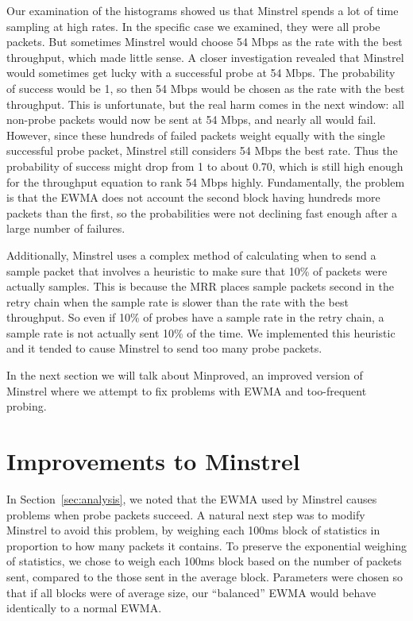 \documentclass[twocolumn,10pt]{article}
\begin{document}
Our examination of the histograms showed us that Minstrel spends a lot
of time sampling at high rates.  In the specific case we examined, they
were all probe packets.  But sometimes Minstrel would choose 54 Mbps as
the rate with the best throughput, which made little sense.  A closer
investigation revealed that Minstrel would sometimes get lucky with a
successful probe at 54 Mbps.  The probability of success would be 1, so
then 54 Mbps would be chosen as the rate with the best throughput.  This
is unfortunate, but the real harm comes in the next window: all non-probe 
packets would now be sent at 54 Mbps, and nearly all would fail.  However,
since these hundreds of failed packets weight equally with the single
successful probe packet, Minstrel still considers 54 Mbps the best
rate.  Thus the probability of success might drop from 1 to about 0.70,
which is still high enough for the throughput equation to rank 54 Mbps
highly.  Fundamentally, the problem is that the EWMA does not account
the second block having hundreds more packets than the first, so the 
probabilities were not declining fast enough after a large number of
   failures.


Additionally, Minstrel uses a complex method of calculating when to send 
a sample packet that involves a heuristic to make sure that 10\% of 
packets were actually samples. This is because the MRR places sample 
packets second in the retry chain when the sample rate is slower than 
the rate with the best throughput. So even if 10\% of probes have a 
sample rate in the retry chain, a sample rate is not actually sent 10\% 
of the time. We implemented this heuristic and it tended to cause 
Minstrel to send too many probe packets.

In the next section we will talk about Minproved, an improved version 
of Minstrel where we attempt to fix problems with EWMA and too-frequent
 probing.

\section{Improvements to Minstrel} \label{sec:minproved}

In Section~\ref{sec:analysis}, we noted that the EWMA used by Minstrel
causes problems when probe packets succeed.  A natural next step was
to modify Minstrel to avoid this problem, by weighing each 100ms block
of statistics in proportion to how many packets it contains.  To
preserve the exponential weighing of statistics, we chose to weigh
each 100ms block based on the number of packets sent, compared to the
those sent in the average block.  Parameters were chosen so that if
all blocks were of average size, our ``balanced'' EWMA would behave
identically to a normal EWMA.
\end{document}
